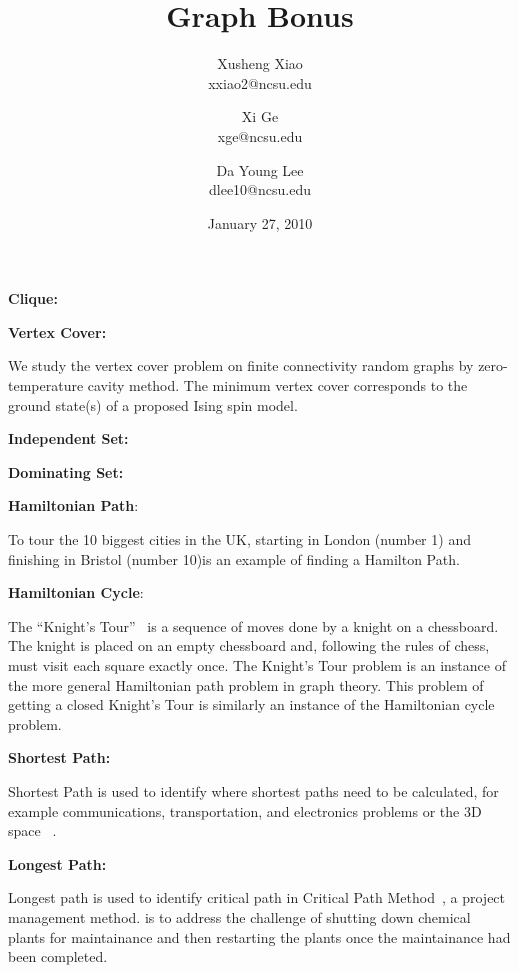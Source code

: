\documentclass[article, 10pt,onecolumn]{article}
\title{Graph Bonus}
\author{
Xusheng Xiao\\
\small{xxiao2@ncsu.edu}\\
\and
Xi Ge\\
\small{xge@ncsu.edu}\\
\and
Da Young Lee\\
\small{dlee10@ncsu.edu}
}
\date{January 27, 2010}
\begin{document}
\maketitle

\begin{flushleft}
\textbf{Clique:}\end{flushleft} 

\begin{flushleft}
\textbf{Vertex Cover:}\end{flushleft} We study the vertex cover problem on finite connectivity random graphs by zero-temperature cavity method. The minimum vertex cover corresponds to the ground state(s) of a proposed Ising spin model.\cite{Vertex}

\begin{flushleft}
\textbf{Independent Set:}\end{flushleft} 

\begin{flushleft}
\textbf{Dominating Set:}\end{flushleft} 

\begin{flushleft}
\textbf{Hamiltonian Path}:\end{flushleft} To tour the 10 biggest cities in the UK, starting in London (number 1) and finishing in Bristol (number 10)is an example of finding a Hamilton Path.~\cite{path}

\begin{flushleft}
\textbf{Hamiltonian Cycle}:\end{flushleft} The ``Knight's Tour''~\cite{knight} is a sequence of moves done by a knight on a chessboard. The knight is placed on an empty chessboard and, following the rules of chess, must visit each square exactly once. The Knight's Tour problem is an instance of the more general Hamiltonian path problem in graph theory. This problem of getting a closed Knight's Tour is similarly an instance of the Hamiltonian cycle problem.

\begin{flushleft}
\textbf{Shortest Path:}\end{flushleft} Shortest Path is used to identify where shortest paths need to be calculated, for example communications, transportation, and electronics problems or the 3D space ~\cite{Mobile}. 

\begin{flushleft}
\textbf{Longest Path:}\end{flushleft} Longest path is used to identify critical path in Critical Path Method~\cite{cpm}, a project management method.  is to address the challenge of shutting down chemical plants for maintainance and then restarting the plants once the maintainance had been completed. 
\end{document}
